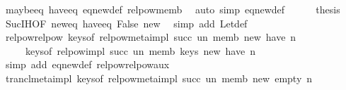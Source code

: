 \begin{isabellebody}
\ maybe{\isacharunderscore}{\kern0pt}eq\ have{\isacharprime}{\kern0pt}{\isacharunderscore}{\kern0pt}eq\ eq{\isacharunderscore}{\kern0pt}new{\isacharunderscore}{\kern0pt}def\ relpow{\isacharprime}{\kern0pt}{\isachardot}{\kern0pt}memb\ \isamarkupfalse%
\ {\isacharparenleft}{\kern0pt}auto\ simp{\isacharcolon}{\kern0pt}\ eq{\isacharunderscore}{\kern0pt}new{\isacharunderscore}{\kern0pt}def{\isacharparenright}{\kern0pt}\isanewline
\ \ \ \ \isamarkupfalse%
\ {\isacharquery}{\kern0pt}thesis\ \isamarkupfalse%
\ Suc{\isachardot}{\kern0pt}IH{\isacharbrackleft}{\kern0pt}OF\ new{\isacharprime}{\kern0pt}{\isacharunderscore}{\kern0pt}eq\ have{\isacharprime}{\kern0pt}{\isacharunderscore}{\kern0pt}eq{\isacharbrackright}{\kern0pt}\ False\ new{\isacharprime}{\kern0pt}\ \isamarkupfalse%
\ {\isacharparenleft}{\kern0pt}simp\ add{\isacharcolon}{\kern0pt}\ Let{\isacharunderscore}{\kern0pt}def{\isacharparenright}{\kern0pt}\isanewline
\ \ \isamarkupfalse%
\isanewline
{}\isamarkupfalse%
%
\endisatagproof
{\isafoldproof}%
%
\isadelimproof
\isanewline
%
\endisadelimproof
\isanewline
{}\isamarkupfalse%
\ relpow{\isacharunderscore}{\kern0pt}relpow{\isacharprime}{\kern0pt}{\isacharcolon}{\kern0pt}\ {\isachardoublequoteopen}keys{\isacharunderscore}{\kern0pt}of\ {\isacharparenleft}{\kern0pt}relpow{\isacharunderscore}{\kern0pt}meta{\isacharunderscore}{\kern0pt}impl\ succ\ un\ memb\ new\ have\ n{\isacharparenright}{\kern0pt}\isanewline
\ \ \ \ {\isacharequal}{\kern0pt}\ keys{\isacharunderscore}{\kern0pt}of\ {\isacharparenleft}{\kern0pt}relpow{\isacharunderscore}{\kern0pt}impl\ succ{\isacharprime}{\kern0pt}\ un{\isacharprime}{\kern0pt}\ memb\ {\isacharparenleft}{\kern0pt}keys\ new{\isacharparenright}{\kern0pt}\ have\ n{\isacharparenright}{\kern0pt}{\isachardoublequoteclose}\isanewline
%
\isadelimproof
\ \ %
\endisadelimproof
%
\isatagproof
{}\isamarkupfalse%
\ {\isacharparenleft}{\kern0pt}simp\ add{\isacharcolon}{\kern0pt}\ eq{\isacharunderscore}{\kern0pt}new{\isacharunderscore}{\kern0pt}def\ relpow{\isacharunderscore}{\kern0pt}relpow{\isacharprime}{\kern0pt}{\isacharunderscore}{\kern0pt}aux{\isacharparenright}{\kern0pt}%
\endisatagproof
{\isafoldproof}%
%
\isadelimproof
\isanewline
%
\endisadelimproof
\isanewline
{}\isamarkupfalse%
\ trancl{\isacharunderscore}{\kern0pt}meta{\isacharunderscore}{\kern0pt}impl{\isacharcolon}{\kern0pt}\ {\isachardoublequoteopen}keys{\isacharunderscore}{\kern0pt}of\ {\isacharparenleft}{\kern0pt}relpow{\isacharunderscore}{\kern0pt}meta{\isacharunderscore}{\kern0pt}impl\ succ\ un\ memb\ new\ empty\ n{\isacharparenright}{\kern0pt}\isanewline

\end{isabellebody}
